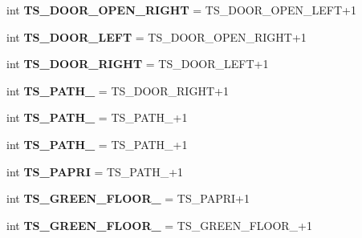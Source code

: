 \begin{DoxyCompactItemize}
\item 
\hypertarget{namespaceconstants_a55a85b86e4bb0d2ffd601670120f47f7}{}int {\bfseries T\+S\+\_\+\+D\+O\+O\+R\+\_\+\+O\+P\+E\+N\+\_\+\+R\+I\+G\+H\+T} = T\+S\+\_\+\+D\+O\+O\+R\+\_\+\+O\+P\+E\+N\+\_\+\+L\+E\+F\+T+1\label{namespaceconstants_a55a85b86e4bb0d2ffd601670120f47f7}

\item 
\hypertarget{namespaceconstants_a8e819e22595c2743c93e829afde9bcee}{}int {\bfseries T\+S\+\_\+\+D\+O\+O\+R\+\_\+\+L\+E\+F\+T} = T\+S\+\_\+\+D\+O\+O\+R\+\_\+\+O\+P\+E\+N\+\_\+\+R\+I\+G\+H\+T+1\label{namespaceconstants_a8e819e22595c2743c93e829afde9bcee}

\item 
\hypertarget{namespaceconstants_a912e44dd55769e335599e7b9e750b9bf}{}int {\bfseries T\+S\+\_\+\+D\+O\+O\+R\+\_\+\+R\+I\+G\+H\+T} = T\+S\+\_\+\+D\+O\+O\+R\+\_\+\+L\+E\+F\+T+1\label{namespaceconstants_a912e44dd55769e335599e7b9e750b9bf}

\item 
\hypertarget{namespaceconstants_a9bcfe3ac8295c126a58a7c4478415d9e}{}int {\bfseries T\+S\+\_\+\+P\+A\+T\+H\+\_} = T\+S\+\_\+\+D\+O\+O\+R\+\_\+\+R\+I\+G\+H\+T+1\label{namespaceconstants_a9bcfe3ac8295c126a58a7c4478415d9e}

\item 
\hypertarget{namespaceconstants_abd5e8d0a064b79d5c1a13c4008d2d8ff}{}int {\bfseries T\+S\+\_\+\+P\+A\+T\+H\+\_} = T\+S\+\_\+\+P\+A\+T\+H\+\_+1\label{namespaceconstants_abd5e8d0a064b79d5c1a13c4008d2d8ff}

\item 
\hypertarget{namespaceconstants_ae89c8ae908b3a81b7c030d6dbd11fbde}{}int {\bfseries T\+S\+\_\+\+P\+A\+T\+H\+\_} = T\+S\+\_\+\+P\+A\+T\+H\+\_+1\label{namespaceconstants_ae89c8ae908b3a81b7c030d6dbd11fbde}

\item 
\hypertarget{namespaceconstants_ab7ee1353590e8214732c240f7f66fc7f}{}int {\bfseries T\+S\+\_\+\+P\+A\+P\+R\+I} = T\+S\+\_\+\+P\+A\+T\+H\+\_+1\label{namespaceconstants_ab7ee1353590e8214732c240f7f66fc7f}

\item 
\hypertarget{namespaceconstants_ad51324bca11e3b1e70341a1ac94c8ebc}{}int {\bfseries T\+S\+\_\+\+G\+R\+E\+E\+N\+\_\+\+F\+L\+O\+O\+R\+\_} = T\+S\+\_\+\+P\+A\+P\+R\+I+1\label{namespaceconstants_ad51324bca11e3b1e70341a1ac94c8ebc}

\item 
\hypertarget{namespaceconstants_a800c32c8bcb2ce7c89f4577789f95ae4}{}int {\bfseries T\+S\+\_\+\+G\+R\+E\+E\+N\+\_\+\+F\+L\+O\+O\+R\+\_} = T\+S\+\_\+\+G\+R\+E\+E\+N\+\_\+\+F\+L\+O\+O\+R\+\_+1\label{namespaceconstants_a800c32c8bcb2ce7c89f4577789f95ae4}


\end{DoxyCompactItemize}
